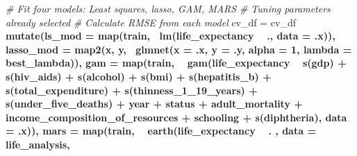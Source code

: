 \documentclass[]{article}
\newenvironment{Shaded}{\begin{snugshade}}{\end{snugshade}}
\newcommand{\KeywordTok}[1]{\textcolor[rgb]{0.13,0.29,0.53}{\textbf{#1}}}
\newcommand{\DataTypeTok}[1]{\textcolor[rgb]{0.13,0.29,0.53}{#1}}
\newcommand{\DecValTok}[1]{\textcolor[rgb]{0.00,0.00,0.81}{#1}}
\newcommand{\StringTok}[1]{\textcolor[rgb]{0.31,0.60,0.02}{#1}}
\newcommand{\CommentTok}[1]{\textcolor[rgb]{0.56,0.35,0.01}{\textit{#1}}}
\newcommand{\OperatorTok}[1]{\textcolor[rgb]{0.81,0.36,0.00}{\textbf{#1}}}
\newcommand{\NormalTok}[1]{#1}
\begin{document}
\begin{Shaded}
\begin{Highlighting}[]
{{\CommentTok{# Fit four models: Least squares, lasso, GAM, MARS }
\CommentTok{# Tuning parameters already selected}
\CommentTok{# Calculate RMSE from each model}
\NormalTok{cv_df =}\StringTok{ }\NormalTok{cv_df }\OperatorTok{%
\StringTok{  }\KeywordTok{mutate}\NormalTok{(}\DataTypeTok{ls_mod =} \KeywordTok{map}\NormalTok{(train, }\OperatorTok{~}\KeywordTok{lm}\NormalTok{(life_expectancy }\OperatorTok{~}\StringTok{ }\NormalTok{., }\DataTypeTok{data =}\NormalTok{ .x)), }
         \DataTypeTok{lasso_mod =} \KeywordTok{map2}\NormalTok{(x, y, }\OperatorTok{~}\KeywordTok{glmnet}\NormalTok{(}\DataTypeTok{x =}\NormalTok{ .x, }
                                        \DataTypeTok{y =}\NormalTok{ .y, }\DataTypeTok{alpha =} \DecValTok{1}\NormalTok{, }
                                        \DataTypeTok{lambda =}\NormalTok{ best_lambda)),}
         \DataTypeTok{gam =} \KeywordTok{map}\NormalTok{(train, }\OperatorTok{~}\StringTok{ }\KeywordTok{gam}\NormalTok{(life_expectancy }\OperatorTok{~}\StringTok{ }\KeywordTok{s}\NormalTok{(gdp) }\OperatorTok{+}\StringTok{ }
\StringTok{                                  }\KeywordTok{s}\NormalTok{(hiv_aids) }\OperatorTok{+}\StringTok{ }
\StringTok{                                  }\KeywordTok{s}\NormalTok{(alcohol) }\OperatorTok{+}\StringTok{ }
\StringTok{                                  }\KeywordTok{s}\NormalTok{(bmi) }\OperatorTok{+}\StringTok{ }
\StringTok{                                  }\KeywordTok{s}\NormalTok{(hepatitis_b) }\OperatorTok{+}\StringTok{ }
\StringTok{                                  }\KeywordTok{s}\NormalTok{(total_expenditure) }\OperatorTok{+}\StringTok{ }
\StringTok{                                  }\KeywordTok{s}\NormalTok{(thinness_1_19_years) }\OperatorTok{+}\StringTok{ }
\StringTok{                                  }\KeywordTok{s}\NormalTok{(under_five_deaths) }\OperatorTok{+}\StringTok{ }
\StringTok{                                  }\NormalTok{year }\OperatorTok{+}\StringTok{ }
\StringTok{                                  }\NormalTok{status }\OperatorTok{+}\StringTok{ }
\StringTok{                                  }\NormalTok{adult_mortality }\OperatorTok{+}\StringTok{ }
\StringTok{                                  }\NormalTok{income_composition_of_resources }\OperatorTok{+}\StringTok{ }
\StringTok{                                  }\NormalTok{schooling }\OperatorTok{+}\StringTok{ }
\StringTok{                                  }\KeywordTok{s}\NormalTok{(diphtheria), }
                                \DataTypeTok{data =}\NormalTok{ .x)),}
         \DataTypeTok{mars =} \KeywordTok{map}\NormalTok{(train, }\OperatorTok{~}\StringTok{ }\KeywordTok{earth}\NormalTok{(life_expectancy }\OperatorTok{~}\StringTok{ }\NormalTok{. , }\DataTypeTok{data =}\NormalTok{ life_analysis, }
}}}
\end{Highlighting}
\end{Shaded}
\end{document}
